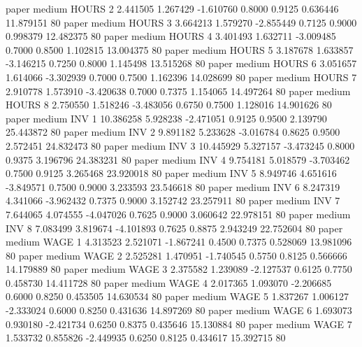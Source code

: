          paper     medium    HOURS                 2  2.441505 1.267429 -1.610760 0.8000 0.9125  0.636446   11.879151 80
         paper     medium    HOURS                 3  3.664213 1.579270 -2.855449 0.7125 0.9000  0.998379   12.482375 80
         paper     medium    HOURS                 4  3.401493 1.632711 -3.009485 0.7000 0.8500  1.102815   13.004375 80
         paper     medium    HOURS                 5  3.187678 1.633857 -3.146215 0.7250 0.8000  1.145498   13.515268 80
         paper     medium    HOURS                 6  3.051657 1.614066 -3.302939 0.7000 0.7500  1.162396   14.028699 80
         paper     medium    HOURS                 7  2.910778 1.573910 -3.420638 0.7000 0.7375  1.154065   14.497264 80
         paper     medium    HOURS                 8  2.750550 1.518246 -3.483056 0.6750 0.7500  1.128016   14.901626 80
         paper     medium      INV                 1 10.386258 5.928238 -2.471051 0.9125 0.9500  2.139790   25.443872 80
         paper     medium      INV                 2  9.891182 5.233628 -3.016784 0.8625 0.9500  2.572451   24.832473 80
         paper     medium      INV                 3 10.445929 5.327157 -3.473245 0.8000 0.9375  3.196796   24.383231 80
         paper     medium      INV                 4  9.754181 5.018579 -3.703462 0.7500 0.9125  3.265468   23.920018 80
         paper     medium      INV                 5  8.949746 4.651616 -3.849571 0.7500 0.9000  3.233593   23.546618 80
         paper     medium      INV                 6  8.247319 4.341066 -3.962432 0.7375 0.9000  3.152742   23.257911 80
         paper     medium      INV                 7  7.644065 4.074555 -4.047026 0.7625 0.9000  3.060642   22.978151 80
         paper     medium      INV                 8  7.083499 3.819674 -4.101893 0.7625 0.8875  2.943249   22.752604 80
         paper     medium     WAGE                 1  4.313523 2.521071 -1.867241 0.4500 0.7375  0.528069   13.981096 80
         paper     medium     WAGE                 2  2.525281 1.470951 -1.740545 0.5750 0.8125  0.566666   14.179889 80
         paper     medium     WAGE                 3  2.375582 1.239089 -2.127537 0.6125 0.7750  0.458730   14.411728 80
         paper     medium     WAGE                 4  2.017365 1.093070 -2.206685 0.6000 0.8250  0.453505   14.630534 80
         paper     medium     WAGE                 5  1.837267 1.006127 -2.333024 0.6000 0.8250  0.431636   14.897269 80
         paper     medium     WAGE                 6  1.693073 0.930180 -2.421734 0.6250 0.8375  0.435646   15.130884 80
         paper     medium     WAGE                 7  1.533732 0.855826 -2.449935 0.6250 0.8125  0.434617   15.392715 80
